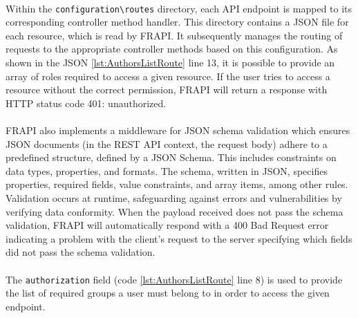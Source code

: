 \paragraph{} Within the \verb|configuration\routes| directory, each API endpoint is mapped to its corresponding controller method handler. This directory contains a JSON file for each resource, which is read by FRAPI. It subsequently manages the routing of requests to the appropriate controller methods based on this configuration. As shown in the JSON \ref{lst:AuthorsListRoute} line 13, it is possible to provide an array of roles required to access a given resource. If the user tries to access a resource without the correct permission, FRAPI will return a response with HTTP status code 401: unauthorized.

\paragraph{} FRAPI also implements a middleware for JSON schema validation which ensures JSON documents (in the REST API context, the request body) adhere to a predefined structure, defined by a JSON Schema. This includes constraints on data types, properties, and formats. The schema, written in JSON, specifies properties, required fields, value constraints, and array items, among other rules. Validation occurs at runtime, safeguarding against errors and vulnerabilities by verifying data conformity. When the payload received does not pass the schema validation, FRAPI will automatically respond with a 400 Bad Request error indicating a problem with the client's request to the server specifying which fields did not pass the schema validation.

\paragraph{} The \verb|authorization| field (code \ref{lst:AuthorsListRoute} line 8) is used to provide the list of required groups a user must belong to in order to access the given endpoint.

\paragraph{}

